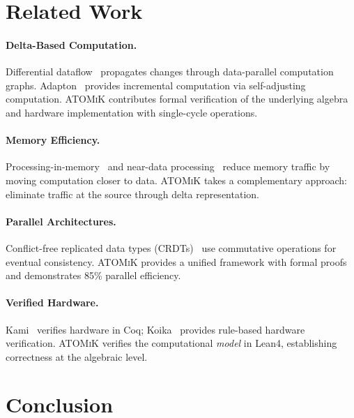 \documentclass[11pt,letterpaper]{article}
\theoremstyle{plain}
\theoremstyle{definition}
\theoremstyle{remark}
\newcommand{\atomik}{\textsc{ATOMiK}}
\begin{document}
\section{Related Work}
\label{sec:related}

\paragraph{Delta-Based Computation.} Differential dataflow~\cite{mcsherry2013differential} propagates changes through data-parallel computation graphs. Adapton~\cite{hammer2014adapton} provides incremental computation via self-adjusting computation. \atomik{} contributes formal verification of the underlying algebra and hardware implementation with single-cycle operations.

\paragraph{Memory Efficiency.} Processing-in-memory~\cite{mutlu2019processing} and near-data processing~\cite{balasubramonian2014near} reduce memory traffic by moving computation closer to data. \atomik{} takes a complementary approach: eliminate traffic at the source through delta representation.

\paragraph{Parallel Architectures.} Conflict-free replicated data types (CRDTs)~\cite{shapiro2011conflict} use commutative operations for eventual consistency. \atomik{} provides a unified framework with formal proofs and demonstrates 85\% parallel efficiency.

\paragraph{Verified Hardware.} Kami~\cite{choi2017kami} verifies hardware in Coq; Koika~\cite{bourgeat2020koika} provides rule-based hardware verification. \atomik{} verifies the computational \emph{model} in Lean4, establishing correctness at the algebraic level.

\section{Conclusion}
\label{sec:conclusion}
\end{document}
